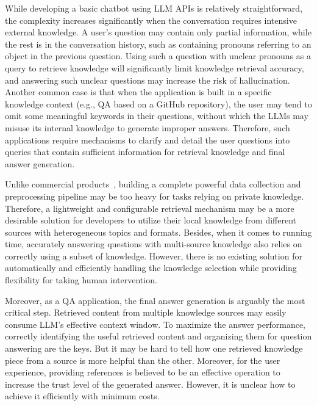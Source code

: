 While developing a basic chatbot using LLM APIs is relatively straightforward, the complexity increases significantly when the conversation requires intensive external knowledge.
A user's question may contain only partial information, while the rest is in the conversation history, such as containing pronouns referring to an object in the previous question.
Using such a question with unclear pronouns as a query to retrieve knowledge will significantly limit knowledge retrieval accuracy, and answering such unclear questions may increase the risk of hallucination.
Another common case is that when the application is built in a specific knowledge context (e.g., QA based on a GitHub repository), the user may tend to omit some meaningful keywords in their questions, without which the LLMs may misuse its internal knowledge to generate improper answers.
Therefore, such applications require mechanisms to clarify and detail the user questions into queries that contain sufficient information for retrieval knowledge and final answer generation. 

Unlike commercial products~\cite{perplexity, kimi}, building a complete powerful data collection and preprocessing pipeline may be too heavy for tasks relying on private knowledge.
Therefore, a lightweight and configurable retrieval mechanism may be a more desirable solution for developers to utilize their local knowledge from different sources with heterogeneous topics and formats.
Besides, when it comes to running time, accurately answering questions with multi-source knowledge also relies on correctly using a subset of knowledge.
However, there is no existing solution for automatically and efficiently handling the knowledge selection while providing flexibility for taking human intervention.

Moreover, as a QA application, the final answer generation is arguably the most critical step.
Retrieved content from multiple knowledge sources may easily consume LLM's effective context window.
To maximize the answer performance, correctly identifying the useful retrieved content and organizing them for question answering are the keys.
But it may be hard to tell how one retrieved knowledge piece from a source is more helpful than the other.
Moreover, for the user experience, providing references is believed to be an effective operation to increase the trust level of the generated answer.
However, it is unclear how to achieve it efficiently with minimum costs.

